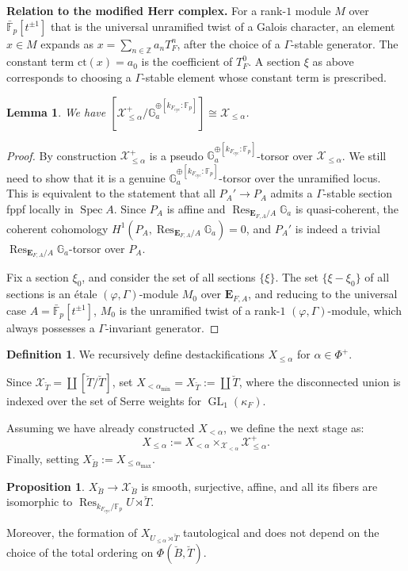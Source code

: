 \documentclass[11pt]{amsart}
\newcommand{\MINOREDITED}[1]{#1}
\newtheorem{lem}[thm]{Lemma}
\theoremstyle{definition}
\newtheorem{prop}[thm]{Proposition}
\newtheorem{defn}[thm]{Definition}
\newcommand{\Z}{\mathbb{Z}}
\newcommand{\G}{\mathbb{G}}
\newcommand{\F}{\mathbb{F}}
\newcommand{\bfE}{\mathbf{E}}
\newcommand{\bFp}{\bar{\mathbb{F}}_p}
\newcommand{\cX}{\mathcal{X}}
\newcommand{\bB}{\breve{B}}
\newcommand{\bT}{\breve{T}}
\newcommand{\cyc}{{\operatorname{cyc}}}
\DeclareMathOperator{\GL}{GL}
\DeclareMathOperator{\Spec}{Spec}
\DeclareMathOperator{\Res}{Res}
\begin{document}
\noindent
{\bf Relation to the modified Herr complex.}
For a rank-$1$ module $M$ over $\bFp[t^{\pm1}]$
that is the universal unramified twist of a Galois character,
an element $x\in M$ expands as $x=\sum_{n\in\Z}a_nT_F^n$,
after the choice of a $\Gamma$-stable generator.
The constant term $\mathrm{ct}(x)=a_0$ is the coefficient
of $T_F^0$. A section $\xi$ as above corresponds to
choosing a $\Gamma$-stable element whose constant term
is prescribed. 

\begin{lem}
We have $[\cX_{\le \alpha}^+/\G_a^{\oplus [k_{F_{\cyc}}:\F_p]}]
\cong \cX_{\le \alpha}$.
\end{lem}

\begin{proof}
By construction $\cX_{\le \MINOREDITED{\alpha}}^+$
is a pseudo $\G_a^{\oplus [k_{F_{\cyc}}:\F_p]}$-torsor over
$\cX_{\le \MINOREDITED{\alpha}}$.
We still need to show that it is a genuine $\G_a^{\oplus [k_{F_{\cyc}}:\F_p]}$-torsor over the unramified locus.
This is equivalent to the statement that
all $P_A'\to P_A$
admits a $\Gamma$-stable section fppf locally
in $\Spec A$.
Since $P_A$ is affine
and $\Res_{\bfE_{F,A}/A}\G_a$ is quasi-coherent, the coherent cohomology
$H^1(P_A, \Res_{\bfE_{F,A}/A}\G_a)=0$,
and $P_A'$ is indeed a trivial $\Res_{\bfE_{F,A}/A}\G_a$-torsor
over $P_A$.

Fix a section $\xi_0$,
and consider the set of all sections $\{\xi\}$.
The set $\{\xi-\xi_0\}$ of all sections is an
\'etale $(\varphi,\Gamma)$-module $M_0$ over $\bfE_{F,A}$,
and reducing to the universal case $A=\bFp[t^{\pm1}]$,
$M_0$ is the unramified twist of a rank-$1$
$(\varphi,\Gamma)$-module, which always possesses a
$\Gamma$-invariant generator.
\end{proof}

\begin{defn}
We recursively define
destackifications
$X_{\le \alpha}$ for $\alpha\in \Phi^+$.

Since $\cX_{\bT}=\coprod[\bT/\bT]$,
set
$X_{\MINOREDITED{<} \alpha_{\min}}=X_{\bT}:=\coprod \bT$,
where the disconnected union is indexed over
the set of Serre weights for $\GL_1(\kappa_F)$.

Assuming we have already constructed $X_{<\alpha}$, we define the next stage as:
\[
X_{\le \alpha} := X_{< \alpha} \times_{\cX_{< \alpha}} \cX_{\le \alpha}^+.
\]
Finally, setting $X_{\bB} := X_{\le \alpha_{\max}}$.
\end{defn}

\begin{prop}
$X_{\bB}\to \cX_{\bB}$ is smooth, surjective,
affine, and \MINOREDITED{all its fibers}
are isomorphic to $\Res_{k_{F_{\cyc}}/\F_p}U\rtimes \bT$.

Moreover, the formation of $X_{U_{\le \alpha}\rtimes \bT}$
tautological and does not depend
on the choice of the total ordering on $\Phi(\bB, \bT)$.
\label{prop:Borel-destack}
\end{prop}
\end{document}
